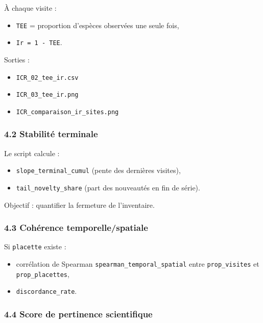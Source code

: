 À chaque visite :

\begin{itemize}
\tightlist
\item
  \texttt{TEE} = proportion d'espèces observées une seule fois,
\item
  \texttt{Ir\ =\ 1\ -\ TEE}.
\end{itemize}

Sorties :

\begin{itemize}
\tightlist
\item
  \texttt{ICR\_02\_tee\_ir.csv}
\item
  \texttt{ICR\_03\_tee\_ir.png}
\item
  \texttt{ICR\_comparaison\_ir\_sites.png}
\end{itemize}

\subsubsection{4.2 Stabilité terminale}\label{stabilituxe9-terminale}

Le script calcule :

\begin{itemize}
\tightlist
\item
  \texttt{slope\_terminal\_cumul} (pente des dernières visites),
\item
  \texttt{tail\_novelty\_share} (part des nouveautés en fin de série).
\end{itemize}

Objectif : quantifier la fermeture de l'inventaire.

\subsubsection{4.3 Cohérence
temporelle/spatiale}\label{cohuxe9rence-temporellespatiale}

Si \texttt{placette} existe :

\begin{itemize}
\tightlist
\item
  corrélation de Spearman \texttt{spearman\_temporal\_spatial} entre
  \texttt{prop\_visites} et \texttt{prop\_placettes},
\item
  \texttt{discordance\_rate}.
\end{itemize}

\subsubsection{4.4 Score de pertinence
scientifique}\label{score-de-pertinence-scientifique}


